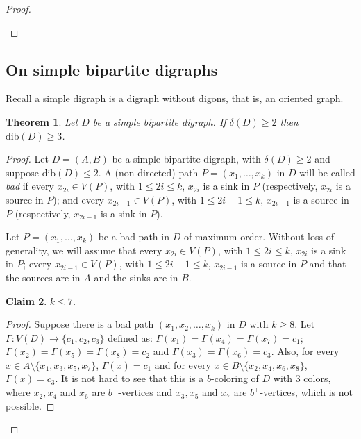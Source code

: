 \documentclass[12pt]{article}
\newtheorem{theorem}{Theorem}
\newtheorem{claim}[theorem]{Claim}
\begin{document}
\begin{proof}
\begin{enumerate}
\end{enumerate}
\end{proof}

\subsection{On simple bipartite digraphs}

Recall a simple digraph is a digraph without digons, that is, an oriented graph.



\begin{theorem}\label{d=3} Let $D$ be a simple bipartite  digraph.  If $\delta(D)\geq 2$ then $\text{dib}(D)\geq 3$.     
\end{theorem} 
\begin{proof} Let $D=(A,B)$ be a simple bipartite  digraph, with $\delta(D)\geq 2$ and suppose  $\text{dib}(D)\leq 2$. 
A (non-directed) path $P = (x_1, \dots, x_k)$ in $D$ will be called \emph{bad} if every $x_{2i}\in V(P)$, with $1\leq 2i\leq k$, $x_{2i}$ is a sink in $P$ (respectively, $x_{2i}$ is a source in $P$); and every $x_{2i-1}\in V(P)$, with $1\leq 2i-1\leq k$, $x_{2i-1}$ is a source in $P$ (respectively, $x_{2i-1}$ is a sink in $P$).




Let $P=(x_1, \dots, x_k)$ be a bad path in $D$ of maximum order. Without loss of generality, we will assume that every $x_{2i}\in V(P)$, with $1\leq 2i\leq k$, $x_{2i}$ is a sink in $P$; every $x_{2i-1}\in V(P)$, with $1\leq 2i-1\leq k$, $x_{2i-1}$ is a source in $P$ and that  the sources are in $A$ and the sinks are in $B$.


\begin{claim}\label{b8} $k\leq 7$.
\end{claim}
\begin{proof} Suppose there is a bad path $(x_1, x_2, \dots, x_k)$ in $D$ with $k\geq 8$.   Let $\Gamma: V(D) \rightarrow \{c_1, c_2, c_3\}$ defined as: $\Gamma(x_1) = \Gamma(x_4) = \Gamma(x_7) = c_1$; $\Gamma(x_2) = \Gamma(x_5) = \Gamma(x_8)= c_2$ and $\Gamma(x_3) = \Gamma(x_6) = c_3$. Also, for every $x\in A\setminus\{x_1, x_3, x_5, x_7\}$, $\Gamma(x) = c_1$ and for every $x\in B\setminus\{x_2, x_4, x_6, x_8\}$, $\Gamma(x) = c_3$. It is not hard to see that this is a $b$-coloring of $D$ with 3 colors, where $x_2, x_4$ and $x_6$ are $b^-$-vertices and $x_3, x_5$ and $x_7$ are $b^+$-vertices,  which is not possible. 
\end{proof}



\end{proof}
\end{document}
